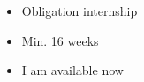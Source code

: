 


\twocolumnsection
{
	\begin{skills}
\end{skills}}{
	\vspace{1em}
		\begin{itemize}
		\item Obligation internship
		\item Min. 16 weeks            
		\item I am available now
	\end{itemize}
}
